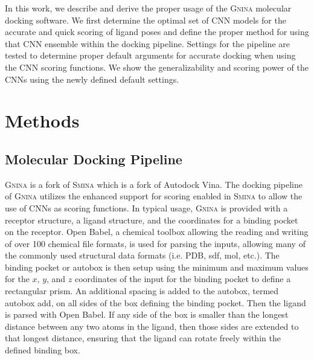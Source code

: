 \documentclass[journal=jcisd8,manuscript=article]{achemso}
\begin{document}
In this work, we describe and derive the proper usage of the \textsc{Gnina} molecular docking software. We first determine the optimal set of CNN models for the accurate and quick scoring of ligand poses and define the proper method for using that CNN ensemble within the docking pipeline. Settings for the pipeline are tested to determine proper default arguments for accurate docking when using the CNN scoring functions. We show the generalizability and scoring power of the CNNs using the newly defined default settings. 

\section{Methods}

\subsection{Molecular Docking Pipeline}
\textsc{\textsc{Gnina}} is a fork of \textsc{Smina} which is a fork of Autodock Vina. The docking pipeline of \textsc{\textsc{Gnina}} utilizes the enhanced support for scoring enabled in \textsc{Smina} to allow the use of CNNs as scoring functions. In typical usage, \textsc{\textsc{Gnina}} is provided with a receptor structure, a ligand structure, and the coordinates for a binding pocket on the receptor. Open Babel\cite{o2011open,babelopen}, a chemical toolbox allowing the reading and writing of over 100 chemical file formats, is used for parsing the inputs, allowing many of the commonly used structural data formats (i.e. PDB, sdf, mol, etc.). The binding pocket or autobox is then setup using the minimum and maximum values for the $x$, $y$, and $z$ coordinates of the input for the binding pocket to define a rectangular prism. An additional spacing is added to the autobox, termed autobox add, on all sides of the box defining the binding pocket. Then the ligand is parsed with Open Babel. If any side of the box is smaller than the longest distance between any two atoms in the ligand, then those sides are extended to that longest distance, ensuring that the ligand can rotate freely within the defined binding box.
\end{document}
